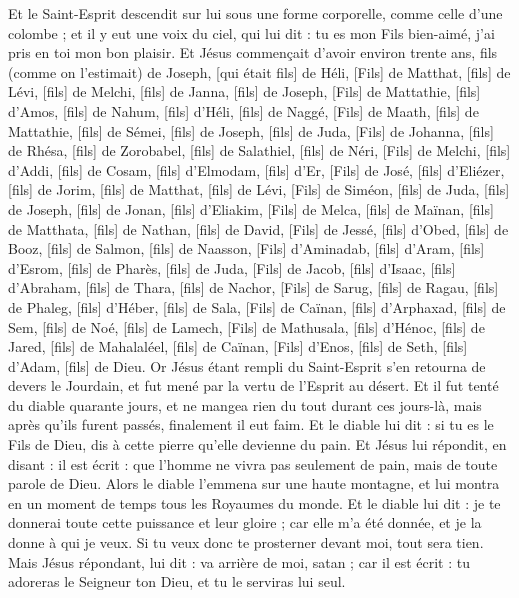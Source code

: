 \begin{multicols}{2}
Et le Saint-Esprit descendit sur lui sous une forme corporelle, comme celle d'une colombe ; et il y eut une voix du ciel, qui lui dit : tu es mon Fils bien-aimé, j'ai pris en toi mon bon plaisir.
Et Jésus commençait d'avoir environ trente ans, fils (comme on l'estimait) de Joseph, [qui était fils] de Héli,
[Fils] de Matthat, [fils] de Lévi, [fils] de Melchi, [fils] de Janna, [fils] de Joseph,
[Fils] de Mattathie, [fils] d'Amos, [fils] de Nahum, [fils] d'Héli, [fils] de Naggé,
[Fils] de Maath, [fils] de Mattathie, [fils] de Sémei, [fils] de Joseph, [fils] de Juda,
[Fils] de Johanna, [fils] de Rhésa, [fils] de Zorobabel, [fils] de Salathiel, [fils] de Néri,
[Fils] de Melchi, [fils] d'Addi, [fils] de Cosam, [fils] d'Elmodam, [fils] d'Er,
[Fils] de José, [fils] d'Eliézer, [fils] de Jorim, [fils] de Matthat, [fils] de Lévi,
[Fils] de Siméon, [fils] de Juda, [fils] de Joseph, [fils] de Jonan, [fils] d'Eliakim,
[Fils] de Melca, [fils] de Maïnan, [fils] de Matthata, [fils] de Nathan, [fils] de David,
[Fils] de Jessé, [fils] d'Obed, [fils] de Booz, [fils] de Salmon, [fils] de Naasson,
[Fils] d'Aminadab, [fils] d'Aram, [fils] d'Esrom, [fils] de Pharès, [fils] de Juda,
[Fils] de Jacob, [fils] d'Isaac, [fils] d'Abraham, [fils] de Thara, [fils] de Nachor,
[Fils] de Sarug, [fils] de Ragau, [fils] de Phaleg, [fils] d'Héber, [fils] de Sala,
[Fils] de Caïnan, [fils] d'Arphaxad, [fils] de Sem, [fils] de Noé, [fils] de Lamech,
[Fils] de Mathusala, [fils] d'Hénoc, [fils] de Jared, [fils] de Mahalaléel, [fils] de Caïnan,
[Fils] d'Enos, [fils] de Seth, [fils] d'Adam, [fils] de Dieu.
\VerseOne{}Or Jésus étant rempli du Saint-Esprit s'en retourna de devers le Jourdain, et fut mené par la vertu de l'Esprit au désert.
Et il fut tenté du diable quarante jours, et ne mangea rien du tout durant ces jours-là, mais après qu'ils furent passés, finalement il eut faim.
Et le diable lui dit : si tu es le Fils de Dieu, dis à cette pierre qu'elle devienne du pain.
Et Jésus lui répondit, en disant : il est écrit : que l'homme ne vivra pas seulement de pain, mais de toute parole de Dieu.
Alors le diable l'emmena sur une haute montagne, et lui montra en un moment de temps tous les Royaumes du monde.
Et le diable lui dit : je te donnerai toute cette puissance et leur gloire ; car elle m'a été donnée, et je la donne à qui je veux.
Si tu veux donc te prosterner devant moi, tout sera tien.
Mais Jésus répondant, lui dit : va arrière de moi, satan ; car il est écrit : tu adoreras le Seigneur ton Dieu, et tu le serviras lui seul.

\end{multicols}
